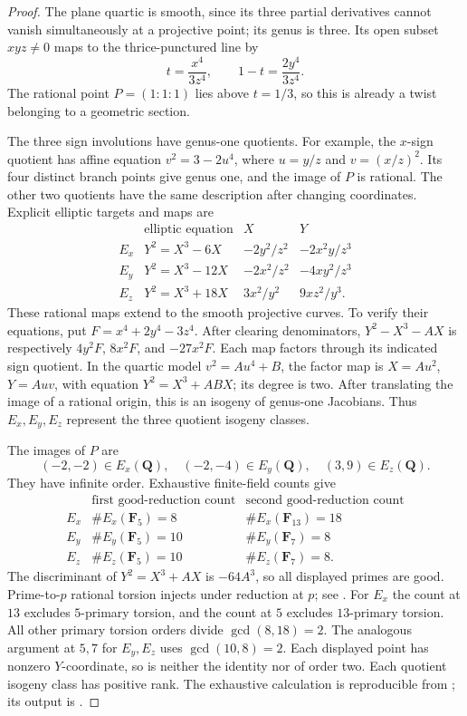 \begin{proof}
The plane quartic is smooth, since its three partial derivatives cannot
vanish simultaneously at a projective point; its genus is three. Its
open subset $xyz\ne0$ maps to the thrice-punctured line by
\[
 t=\frac{x^4}{3z^4},\qquad 1-t=\frac{2y^4}{3z^4}.
\]
The rational point $P=(1:1:1)$ lies above $t=1/3$, so this is already
a twist belonging to a geometric section.

The three sign involutions have genus-one quotients. For example, the
$x$-sign quotient has affine equation $v^2=3-2u^4$, where
$u=y/z$ and $v=(x/z)^2$. Its four distinct branch points give genus
one, and the image of $P$ is rational. The other two quotients have the
same description after changing coordinates. Explicit elliptic targets
and maps are
\[
\begin{array}{c|c|c|c}
 &\text{elliptic equation}&X&Y\\\hline
 E_x&Y^2=X^3-6X&-2y^2/z^2&-2x^2y/z^3\\
 E_y&Y^2=X^3-12X&-2x^2/z^2&-4xy^2/z^3\\
 E_z&Y^2=X^3+18X&3x^2/y^2&9xz^2/y^3.
\end{array}
\]
These rational maps extend to the smooth projective curves. To verify
their equations, put $F=x^4+2y^4-3z^4$. After clearing denominators,
$Y^2-X^3-AX$ is respectively $4y^2F$, $8x^2F$, and $-27x^2F$.
Each map factors through its indicated sign quotient. In the quartic
model $v^2=A u^4+B$, the factor map is
$X=A u^2$, $Y=Auv$, with equation $Y^2=X^3+ABX$; its degree is two.
After translating the image of a rational origin, this is an isogeny
of genus-one Jacobians. Thus $E_x,E_y,E_z$ represent the three quotient
isogeny classes.

The images of $P$ are
\[
 (-2,-2)\in E_x(\mathbf Q),\quad
 (-2,-4)\in E_y(\mathbf Q),\quad
 (3,9)\in E_z(\mathbf Q).
\]
They have infinite order. Exhaustive finite-field counts give
\[
\begin{array}{c|cc}
 &\text{first good-reduction count}&\text{second good-reduction count}\\\hline
 E_x&\#E_x(\mathbf F_5)=8&\#E_x(\mathbf F_{13})=18\\
 E_y&\#E_y(\mathbf F_5)=10&\#E_y(\mathbf F_7)=8\\
 E_z&\#E_z(\mathbf F_5)=10&\#E_z(\mathbf F_7)=8.
\end{array}
\]
The discriminant of $Y^2=X^3+AX$ is $-64A^3$, so all displayed
primes are good. Prime-to-$p$ rational torsion injects under reduction
at $p$; see \cite[Chapter~II, Proposition~5.4 and Corollary~5.7]{D_Milne2021}.
For $E_x$ the count at $13$ excludes $5$-primary torsion, and the
count at $5$ excludes $13$-primary torsion. All other primary torsion
orders divide $\gcd(8,18)=2$. The analogous argument at $5,7$ for
$E_y,E_z$ uses $\gcd(10,8)=2$. Each displayed point has nonzero
$Y$-coordinate, so is neither the identity nor of order two. Each
quotient isogeny class has positive rank. The exhaustive calculation is
reproducible from ; its
output is .


\end{proof}

